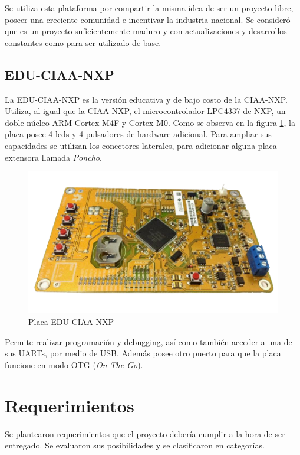 Se utiliza esta plataforma por compartir la misma idea de ser un proyecto libre, poseer una creciente comunidad e incentivar la industria nacional. Se consideró que es un proyecto suficientemente maduro y con actualizaciones y desarrollos constantes como para ser utilizado de base.

\subsection{EDU-CIAA-NXP}
\label{subsec:eduCiaaNxp}
La EDU-CIAA-NXP es la versión educativa y de bajo costo de la CIAA-NXP. Utiliza, al igual que la CIAA-NXP, el microcontrolador LPC4337 de NXP, un doble núcleo ARM Cortex-M4F y Cortex M0. Como se observa en la figura \ref{fig:eduCiaaNxp}, la placa posee 4 leds y 4 pulsadores de hardware adicional. Para ampliar sus capacidades se utilizan los conectores laterales, para adicionar alguna placa extensora llamada \emph{Poncho}.

\begin{figure}[h]
\centering
\includegraphics[scale=.5]{./Figures/edu-ciaa-nxp.png}
\caption{Placa EDU-CIAA-NXP}
\label{fig:eduCiaaNxp}
\end{figure}

Permite realizar programación y debugging, así como también acceder a una de sus UARTs, por medio de USB. Además posee otro puerto para que la placa funcione en modo OTG (\emph{On The Go}).

\section{Requerimientos}
\label{sec:requerimientos}
Se plantearon requerimientos que el proyecto debería cumplir a la hora de ser entregado. Se evaluaron sus posibilidades y se clasificaron en categorías.

